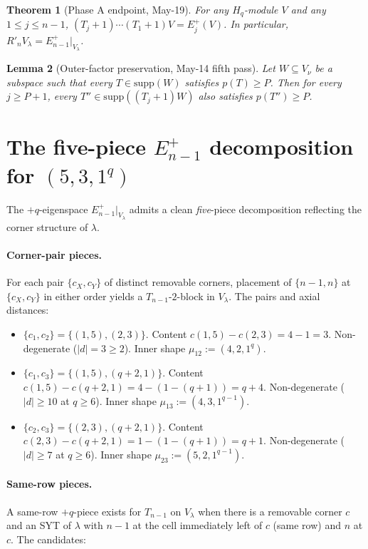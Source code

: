 \documentclass[11pt]{article}
\newtheorem{theorem}{Theorem}
\newtheorem{lemma}[theorem]{Lemma}
\theoremstyle{definition}
\newcommand{\Hq}{H_q}
\newcommand{\supp}{\mathrm{supp}}
\newcommand{\Rp}{{R'}}
\begin{document}
\begin{theorem}[Phase A endpoint, May-19]\label{thm:phaseA}
For any $\Hq$-module $V$ and any $1 \le j \le n-1$,
$(T_j+1)\cdots(T_1+1) V = E_j^+(V)$.  In particular,
$\Rp_n V_\lambda = E_{n-1}^+|_{V_\lambda}$.
\end{theorem}

\begin{lemma}[Outer-factor preservation, May-14 fifth pass]\label{lem:outer-preserve}
Let $W \subseteq V_\nu$ be a subspace such that every $T \in \supp(W)$
satisfies $p(T) \ge P$.  Then for every $j \ge P + 1$,
every $T'' \in \supp((T_j{+}1) W)$ also satisfies $p(T'') \ge P$.
\end{lemma}

\section{The five-piece $E^+_{n-1}$ decomposition for $(5,3,1^q)$}\label{sec:Eplus}

The $+q$-eigenspace $E_{n-1}^+|_{V_\lambda}$ admits a clean
\emph{five}-piece decomposition reflecting the corner structure of $\lambda$.

\paragraph{Corner-pair pieces.}  For each pair $\{c_X, c_Y\}$ of distinct
removable corners, placement of $\{n-1, n\}$ at $\{c_X, c_Y\}$ in either
order yields a $T_{n-1}$-$2$-block in $V_\lambda$.  The pairs and axial
distances:

\begin{itemize}[topsep=0.2em,itemsep=0.1em]
\item $\{c_1, c_2\} = \{(1, 5), (2, 3)\}$.  Content
   $c(1, 5) - c(2, 3) = 4 - 1 = 3$.  Non-degenerate (\(|d| = 3 \ge 2\)).
   Inner shape $\mu_{12} := (4, 2, 1^q)$.
\item $\{c_1, c_3\} = \{(1, 5), (q+2, 1)\}$.  Content $c(1, 5) -
   c(q+2, 1) = 4 - (1 - (q+1)) = q + 4$.  Non-degenerate
   (\(|d| \ge 10\) at \(q \ge 6\)).  Inner shape $\mu_{13} := (4, 3, 1^{q-1})$.
\item $\{c_2, c_3\} = \{(2, 3), (q+2, 1)\}$.  Content $c(2, 3) -
   c(q+2, 1) = 1 - (1 - (q+1)) = q + 1$.  Non-degenerate
   (\(|d| \ge 7\) at \(q \ge 6\)).  Inner shape $\mu_{23} := (5, 2, 1^{q-1})$.
\end{itemize}

\paragraph{Same-row pieces.}  A same-row $+q$-piece exists for
$T_{n-1}$ on $V_\lambda$ when there is a removable corner $c$ and an
SYT of $\lambda$ with $n-1$ at the cell immediately left of $c$ (same
row) and $n$ at $c$.  The candidates:
\end{document}
